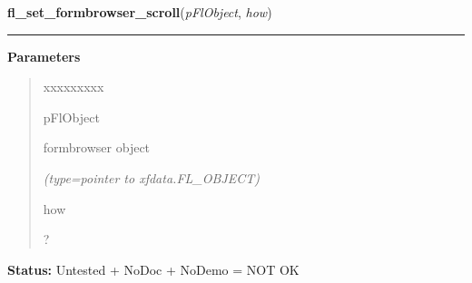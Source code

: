 \hspace{.8\funcindent}\begin{boxedminipage}{\funcwidth}

    \raggedright \textbf{fl\_set\_formbrowser\_scroll}(\textit{pFlObject}, \textit{how})

    \vspace{-1.5ex}

    \rule{\textwidth}{0.5\fboxrule}
\setlength{\parskip}{2ex}
\setlength{\parskip}{1ex}
      \textbf{Parameters}
      \vspace{-1ex}

      \begin{quote}
        \begin{Ventry}{xxxxxxxxx}

          \item[pFlObject]

          formbrowser object

            {\it (type=pointer to xfdata.FL\_OBJECT)}

          \item[how]

          ?

        \end{Ventry}

      \end{quote}

\textbf{Status:} Untested + NoDoc + NoDemo = NOT OK



    \end{boxedminipage}

    \label{xformslib:flformbrowser:fl_set_formbrowser_hscrollbar}

    \vspace{0.5ex}

